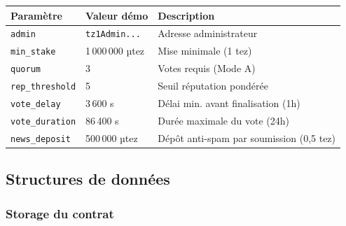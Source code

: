 \documentclass[12pt,a4paper]{article}
\newenvironment{infobox}[1][Info]{%
  \begin{tcolorbox}[
    enhanced, breakable,
    colback=accent!8, colframe=accent!70, coltitle=white,
    title=\textbf{#1}, fonttitle=\small,
    arc=4pt, boxrule=0.8pt,
    left=6pt, right=6pt, top=5pt, bottom=5pt
  ]
}{\end{tcolorbox}}
\begin{document}
\begin{infobox}[Paramètres d'initialisation]
\begin{tabular}{L{3.5cm} L{2.5cm} L{6cm}}
\textbf{Paramètre} & \textbf{Valeur démo} & \textbf{Description} \\
\midrule
\texttt{admin}          & \texttt{tz1Admin...} & Adresse administrateur \\
\texttt{min\_stake}     & 1\,000\,000 µtez     & Mise minimale (1 tez) \\
\texttt{quorum}         & 3                    & Votes requis (Mode A) \\
\texttt{rep\_threshold} & 5                    & Seuil réputation pondérée \\
\texttt{vote\_delay}    & 3\,600 s             & Délai min. avant finalisation (1h) \\
\texttt{vote\_duration} & 86\,400 s            & Durée maximale du vote (24h) \\
\texttt{news\_deposit}  & 500\,000 µtez        & Dépôt anti-spam par soumission (0,5 tez) \\
\end{tabular}
\end{infobox}

\subsection{Structures de données}

\subsubsection{Storage du contrat}
\end{document}
